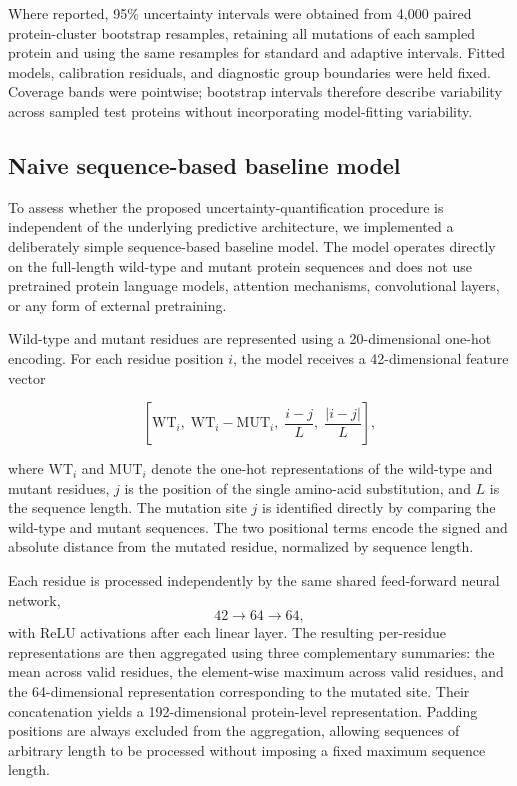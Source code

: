 \documentclass[11pt]{article}
\begin{document}
Where reported, 95\% uncertainty intervals were obtained from 4,000 paired protein-cluster bootstrap resamples, retaining all mutations of each sampled protein and using the same resamples for standard and adaptive intervals. Fitted models, calibration residuals, and diagnostic group boundaries were held fixed. Coverage bands were pointwise; bootstrap intervals therefore describe variability across sampled test proteins without incorporating model-fitting variability.

\subsection{Naive sequence-based baseline model}

To assess whether the proposed uncertainty-quantification procedure is independent of the underlying predictive architecture, we implemented a deliberately simple sequence-based baseline model. The model operates directly on the full-length wild-type and mutant protein sequences and does not use pretrained protein language models, attention mechanisms, convolutional layers, or any form of external pretraining.

Wild-type and mutant residues are represented using a 20-dimensional one-hot encoding. For each residue position $i$, the model receives a 42-dimensional feature vector

\[
\left[
\mathrm{WT}_i,\;
\mathrm{WT}_i-\mathrm{MUT}_i,\;
\frac{i-j}{L},\;
\frac{|i-j|}{L}
\right],
\]

where $\mathrm{WT}_i$ and $\mathrm{MUT}_i$ denote the one-hot representations of the wild-type and mutant residues, $j$ is the position of the single amino-acid substitution, and $L$ is the sequence length. The mutation site $j$ is identified directly by comparing the wild-type and mutant sequences. The two positional terms encode the signed and absolute distance from the mutated residue, normalized by sequence length.

Each residue is processed independently by the same shared feed-forward neural network,
\[
42 \rightarrow 64 \rightarrow 64,
\]
with ReLU activations after each linear layer. The resulting per-residue representations are then aggregated using three complementary summaries: the mean across valid residues, the element-wise maximum across valid residues, and the 64-dimensional representation corresponding to the mutated site. Their concatenation yields a 192-dimensional protein-level representation. Padding positions are always excluded from the aggregation, allowing sequences of arbitrary length to be processed without imposing a fixed maximum sequence length.
\end{document}
